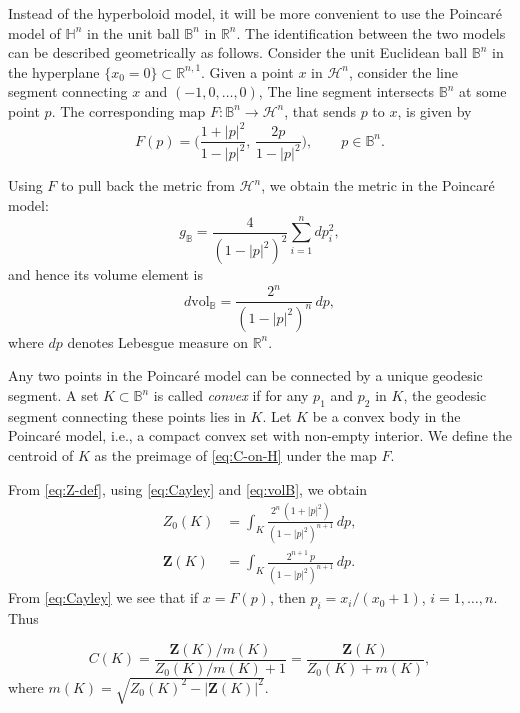 \documentclass[12pt,letterpaper,reqno]{amsart}
\theoremstyle{definition}
\begin{document}
Instead of the hyperboloid model, it will be more convenient to use the Poincar\'e model of $\mathbb H^n$ in the unit ball $\mathbb{B}^n$ in $\mathbb R^n$. The identification between the two models can be described geometrically as follows.  Consider the unit Euclidean ball $\mathbb{B}^n$ in the hyperplane $\{x_0=0\} \subset \mathbb R^{n,1}$. Given  a point $x$  in $\mathcal H^n$, consider the line segment connecting $x$ and $(-1,0,\ldots, 0)$, The line segment intersects $\mathbb{B}^n$ at some point $p$. 
The corresponding map $F:\mathbb{B}^n\to\mathcal{H}^n$, that sends $p$ to $x$, is given by
\begin{equation}\label{eq:Cayley}
	F(p)=\Big(\frac{1+|p|^2}{1-|p|^2},\,\frac{2p}{1-|p|^2}\Big),
	\qquad p\in\mathbb{B}^n.
\end{equation}


 
Using $F$ to pull back the  metric from $\mathcal H^n$, we obtain the metric in  the Poincar\'e model:
\begin{equation}\label{eq:Poincare-metric}
	g_{\mathbb{B}}=\frac{4}{(1-|p|^2)^2}\sum_{i=1}^n dp_i^2,
\end{equation}
and hence its volume element is
\begin{equation}\label{eq:volB}
	d\mathrm{vol}_{\mathbb{B}}
	= \frac{2^n}{(1-|p|^2)^n}\,dp,
\end{equation}
where $dp$ denotes  Lebesgue measure on $\mathbb R^n$.

Any two points in the Poincar\'e model can be connected by a unique geodesic segment. A set $K\subset \mathbb B^n$ is called {\it convex} if for any $p_1$ and $p_2$ in $K$, the geodesic segment connecting these points lies in $K$.    Let $K$ be a convex body in the Poincar\'e model, i.e., a compact convex set with non-empty interior. We define the  centroid   of $K$ as the  preimage of \eqref{eq:C-on-H} under the map $F$. 


From \eqref{eq:Z-def}, using \eqref{eq:Cayley} and \eqref{eq:volB}, we obtain
\begin{align}
	Z_0(K) &= \int_{K}\frac{2^n\,(1+|p|^2)}{(1-|p|^2)^{n+1}}\,dp,\label{eq:Z0-unif}\\
	\bm{Z}(K) &= \int_{K}\frac{2^{n+1}\,p}{(1-|p|^2)^{n+1}}\,dp.\label{eq:Zvec-unif}
\end{align}
From  \eqref{eq:Cayley} we see  that if $x=F(p)$, then $p_i=x_i/(x_0+1)$, $i=1,\ldots, n$. Thus

\begin{equation}\label{eq:ball-centroid}
	C(K)=\frac{\bm{Z}(K)/m(K)}{Z_0(K)/m(K)+1}=\frac{\bm{Z}(K) }{Z_0(K)+m(K)},
\end{equation}
where $m(K)=\sqrt{Z_0(K)^2-|\bm{Z}(K)|^2}$.
\end{document}
